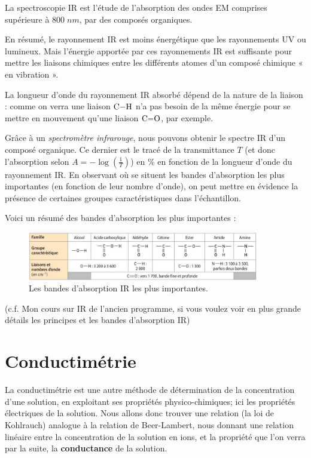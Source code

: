 \documentclass[11pt,a4paper]{article}
\begin{document}
La spectroscopie IR est l’étude de l’absorption des ondes EM comprises supérieure à $800\; nm$, par des composés organiques. 

En résumé, le rayonnement IR est moins énergétique que les rayonnements UV ou lumineux. Mais l’énergie apportée par ces rayonnements IR est suffisante pour mettre les liaisons chimiques entre les différents atomes d’un composé chimique « en vibration ». 

La longueur d’onde du rayonnement IR absorbé dépend de la nature de la liaison : comme on verra une liaison $\ce{C-H}$ n’a pas besoin de la même énergie pour se mettre en mouvement qu’une liaison $\ce{C=O}$, par exemple.  

Grâce à un \textit{spectromètre infrarouge}, nous pouvons obtenir le spectre IR d’un composé organique. Ce dernier est le tracé de la transmittance $T$ (et donc l’absorption selon $A = -\log(\frac{1}{T})$) en $\%$ en fonction de la longueur d’onde du rayonnement IR. En observant où se situent les bandes d'absorption les plus importantes (en fonction de leur nombre d'onde), on peut mettre en évidence la présence de certaines groupes caractéristiques dans l'échantillon.

Voici un résumé des bandes d'absorption les plus importantes : 

\begin{figure}[h]
    \centering
    \includegraphics[width=0.9\textwidth]{imgs/c1/IRtable.png}
    \caption{Les bandes d'absorption IR les plus importantes.}
    \label{fig:bandesIR}
\end{figure}

(c.f. Mon cours sur IR de l'ancien programme, si vous voulez voir en plus grande détails les principes et les bandes d'absorption IR)

\section{Conductimétrie}

La conductimétrie est une autre méthode de détermination de la concentration d'une solution, en exploitant ses propriétés physico-chimiques; ici les propriétés électriques de la solution. Nous allons donc trouver une relation (la loi de Kohlrauch) analogue à la relation de Beer-Lambert, nous donnant une relation linéaire entre la concentration de la solution en ions, et la propriété que l'on verra par la suite, la \textbf{conductance} de la solution.
\end{document}
